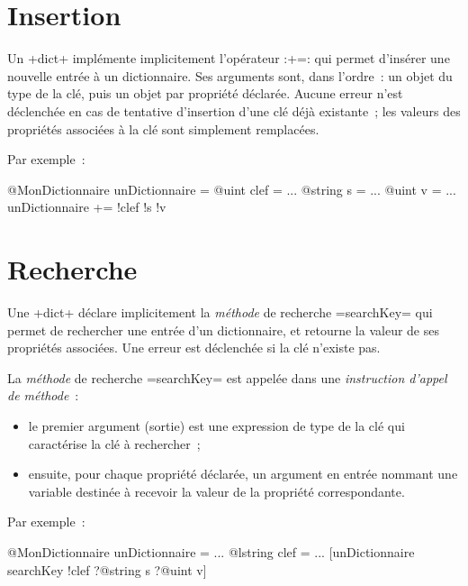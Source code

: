 \section{Insertion}

Un \ggst+dict+ implémente implicitement l'opérateur \ggst:+=: qui permet d'insérer une nouvelle entrée à un dictionnaire. Ses arguments sont, dans l'ordre~: un objet du type de la clé, puis un objet par propriété déclarée. Aucune erreur n'est déclenchée en cas de tentative d'insertion d'une clé déjà existante~; les valeurs des propriétés associées à la clé sont simplement remplacées.

Par exemple~:
\begin{galgas3}
@MonDictionnaire unDictionnaire = {}
@uint clef = ...
@string s = ...
@uint v = ...
unDictionnaire += !clef !s !v
\end{galgas3}











\section{Recherche}

Une \ggst+dict+ déclare implicitement la \emph{méthode} de recherche \ggst=searchKey= qui permet de rechercher une entrée d'un dictionnaire, et retourne la valeur de ses propriétés associées. Une erreur est déclenchée si la clé n'existe pas.

La \emph{méthode} de recherche \ggst=searchKey= est appelée dans une \emph{instruction d'appel de méthode}~:
\begin{itemize}
  \item le premier argument (sortie) est une expression de type de la clé qui caractérise la clé à rechercher~;
  \item ensuite, pour chaque propriété déclarée, un argument en entrée nommant une variable destinée à recevoir la valeur de la propriété correspondante.
\end{itemize}


Par exemple~:
\begin{galgas3}
@MonDictionnaire unDictionnaire = {}
...
@lstring clef = ...
[unDictionnaire searchKey !clef ?@string s ?@uint v]
\end{galgas3}








